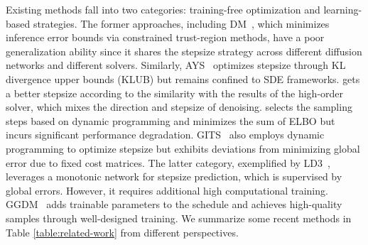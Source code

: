 \documentclass[10pt,twocolumn,letterpaper]{article}
\begin{document}
    Existing methods fall into two categories: training-free optimization and learning-based strategies. The former approaches, including DM~\cite{dm}, which minimizes inference error bounds via constrained trust-region methods, have a poor generalization ability since it shares the stepsize strategy across different diffusion networks and different solvers. Similarly, AYS~\cite{ays} optimizes stepsize through KL divergence upper bounds (KLUB) but remains confined to SDE frameworks. \cite{jolicoeur2021gotta} gets a better stepsize according to the similarity with the results of the high-order solver, which mixes the direction and stepsize of denoising. \cite{watson2021learning} selects the sampling steps based on dynamic programming and minimizes the sum of ELBO but incurs significant performance degradation. GITS~\cite{gits} also employs dynamic programming to optimize stepsize but exhibits deviations from minimizing global error due to fixed cost matrices. The latter category, exemplified by LD3~\cite{ld3}, leverages a monotonic network for stepsize prediction, which is supervised by global errors. However, it requires additional high computational training. GGDM~\cite{watson2021learning2} adds trainable parameters to the schedule and achieves high-quality samples through well-designed training. We summarize some recent methods in Table \ref{table:related-work} from different perspectives.
\end{document}
